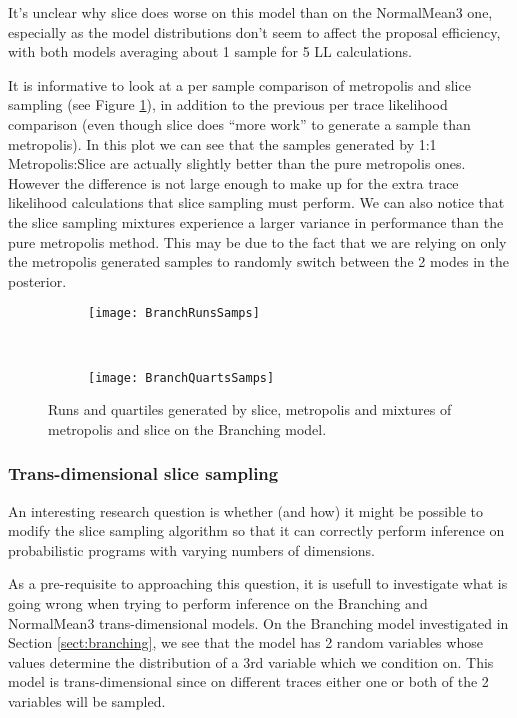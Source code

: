 It's unclear why slice does worse on this model than on the NormalMean3 one, especially as the model distributions don't seem to affect the proposal efficiency, with both models averaging about 1 sample for 5 LL calculations. 

It is informative to look at a per sample comparison of metropolis and slice sampling (see Figure \ref{fig:branchPerfSamps}), in addition to the previous per trace likelihood comparison (even though slice does ``more work'' to generate a sample than metropolis). In this plot we can see that the samples generated by 1:1 Metropolis:Slice are actually slightly better than the pure metropolis ones. However the difference is not large enough to make up for the extra trace likelihood calculations that slice sampling must perform. We can also notice that the slice sampling mixtures experience a larger variance in performance than the pure metropolis method. This may be due to the fact that we are relying on only the metropolis generated samples to randomly switch between the 2 modes in the posterior.

\begin{figure}[h]
        \centering
        \begin{subfigure}[b]{0.48\textwidth}
                \centering
                \texttt{[image: BranchRunsSamps]}
        \end{subfigure}
        ~ 
        \begin{subfigure}[b]{0.48\textwidth}
                \centering
                \texttt{[image: BranchQuartsSamps]}
        \end{subfigure}
    \caption{Runs and quartiles generated by slice, metropolis and mixtures of metropolis and slice on the Branching model.}
    \label{fig:branchPerfSamps}
\end{figure}

\subsubsection{Trans-dimensional slice sampling}
\label{sect:tdSlice}
An interesting research question is whether (and how) it might be possible to modify the slice sampling algorithm so that it can correctly perform inference on probabilistic programs with varying numbers of dimensions.

As a pre-requisite to approaching this question, it is usefull to investigate what is going wrong when trying to perform inference on the Branching and NormalMean3 trans-dimensional models. On the Branching model investigated in Section \ref{sect:branching}, we see that the model has 2 random variables whose values determine the distribution of a 3rd variable which we condition on. This model is trans-dimensional since on different traces either one or both of the 2 variables will be sampled.

